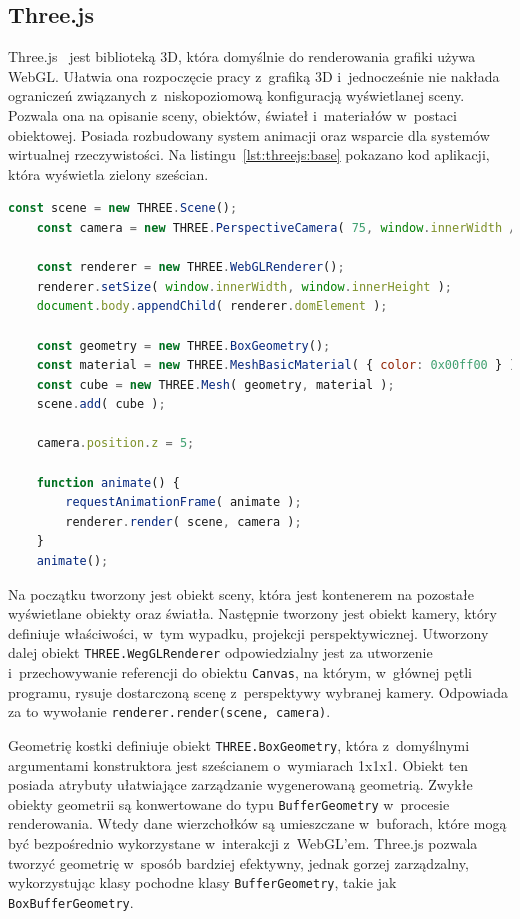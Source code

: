 \subsection{Three.js}

Three.js~\cite{threejs} jest biblioteką 3D, która domyślnie do renderowania grafiki używa WebGL. Ułatwia ona rozpoczęcie pracy z~grafiką 3D i~jednocześnie nie nakłada ograniczeń związanych z~niskopoziomową konfiguracją wyświetlanej sceny. Pozwala ona na opisanie sceny, obiektów, świateł i~materiałów w~postaci obiektowej. Posiada rozbudowany system animacji oraz wsparcie dla systemów wirtualnej rzeczywistości. Na listingu~\ref{lst:threejs:base} pokazano kod aplikacji, która wyświetla zielony sześcian.

\begin{lstlisting}[float=h,language=javascript, label={lst:threejs:base}, caption={Hello World w~świecie grafiki 3D}]
    const scene = new THREE.Scene();
    const camera = new THREE.PerspectiveCamera( 75, window.innerWidth / window.innerHeight, 0.1, 1000 );
    
    const renderer = new THREE.WebGLRenderer();
    renderer.setSize( window.innerWidth, window.innerHeight );
    document.body.appendChild( renderer.domElement );

    const geometry = new THREE.BoxGeometry();
    const material = new THREE.MeshBasicMaterial( { color: 0x00ff00 } );
    const cube = new THREE.Mesh( geometry, material );
    scene.add( cube );

    camera.position.z = 5;

    function animate() {
        requestAnimationFrame( animate );
        renderer.render( scene, camera );
    }
    animate();
\end{lstlisting}

Na początku tworzony jest obiekt sceny, która jest kontenerem na pozostałe wyświetlane obiekty oraz światła. Następnie tworzony jest obiekt kamery, który definiuje właściwości, w~tym wypadku, projekcji perspektywicznej. Utworzony dalej obiekt \texttt{THREE.WegGLRenderer} odpowiedzialny jest za utworzenie i~przechowywanie referencji do obiektu \texttt{Canvas}, na którym, w~głównej pętli programu, rysuje dostarczoną scenę z~perspektywy wybranej kamery. Odpowiada za to wywołanie \texttt{renderer.render(scene, camera)}.

Geometrię kostki definiuje obiekt \texttt{THREE.BoxGeometry}, która z~domyślnymi argumentami konstruktora jest sześcianem o~wymiarach 1x1x1. Obiekt ten posiada atrybuty ułatwiające zarządzanie wygenerowaną geometrią. Zwykłe obiekty geometrii są konwertowane do typu \texttt{BufferGeometry} w~procesie renderowania. Wtedy dane wierzchołków są umieszczane w~buforach, które mogą być bezpośrednio wykorzystane w~interakcji z~WebGL'em. Three.js pozwala tworzyć geometrię w~sposób bardziej efektywny, jednak gorzej zarządzalny, wykorzystując klasy pochodne klasy \texttt{BufferGeometry}, takie jak \texttt{BoxBufferGeometry}.


